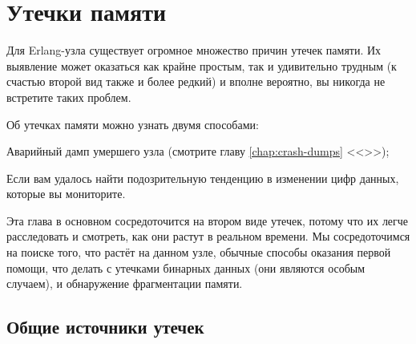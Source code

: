 \documentclass[11pt, oneside]{book}   	%
\newcommand\NamedRef[1]{\ref{#1} <<\nameref{#1}>>}
\begin{document}

\chapter{Утечки памяти}
\label{chap:memory-leaks}

Для Erlang-узла существует огромное множество причин утечек памяти. Их выявление может оказаться как крайне простым, так и удивительно трудным (к счастью второй вид также и более редкий) и вполне вероятно, вы никогда не встретите таких проблем.

Об утечках памяти можно узнать двумя способами:

\begin{enumerate*}
	\item Аварийный дамп умершего узла (смотрите главу \NamedRef{chap:crash-dumps});
	\item Если вам удалось найти подозрительную тенденцию в изменении цифр данных, которые вы мониторите.
\end{enumerate*}

Эта глава в основном сосредоточится на втором виде утечек, потому что их легче расследовать и смотреть, как они растут в реальном времени. Мы сосредоточимся на поиске того, что растёт на данном узле, обычные способы оказания первой помощи, что делать с утечками бинарных данных (они являются особым случаем), и обнаружение фрагментации памяти.


\section{Общие источники утечек}
\end{document}
